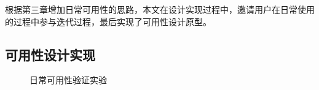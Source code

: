 根据第三章增加日常可用性的思路，本文在设计实现过程中，邀请用户在日常使用的过程中参与迭代过程，最后实现了可用性设计原型。

\subsection{可用性设计实现}

\begin{figure}[h]
    \centering
    \caption{日常可用性验证实验}
    \label{fig:interface}
\end{figure}

